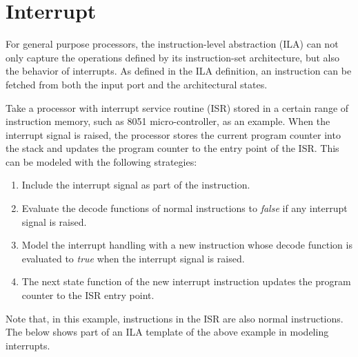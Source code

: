 
\section*{Interrupt}
For general purpose processors, the instruction-level abstraction (ILA) can not 
only capture the operations defined by its instruction-set architecture, but also
the behavior of interrupts.
As defined in the ILA definition, an instruction can be fetched from both the 
input port and the architectural states.

%
Take a processor with interrupt service routine (ISR) stored in a certain range 
of instruction memory, such as 8051 micro-controller, as an example.
When the interrupt signal is raised, the processor stores the current program 
counter into the stack and updates the program counter to the entry point of
the ISR.
This can be modeled with the following strategies:
%
\begin{enumerate}
\item Include the interrupt signal as part of the instruction.
\item Evaluate the decode functions of normal instructions to \textit{false} if 
    any interrupt signal is raised.
\item Model the interrupt handling with a new instruction whose decode 
    function is evaluated to \textit{true} when the interrupt signal is raised.
\item The next state function of the new interrupt instruction updates the 
    program counter to the ISR entry point.
\end{enumerate}

%
Note that, in this example, instructions in the ISR are also normal 
instructions. 
%
The below shows part of an ILA template of the above example in modeling 
interrupts.

